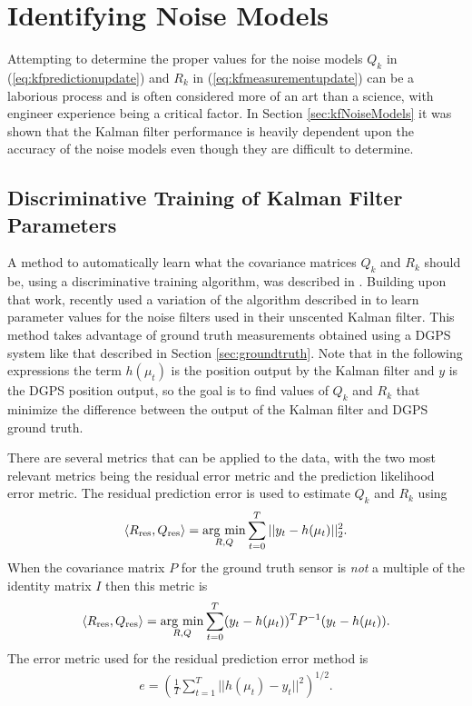 \section{Identifying Noise Models}
\label{sec:kfIdentifyNoiseModels}
Attempting to determine the proper values for the noise models $Q_k$ in (\ref{eq:kfpredictionupdate}) and $R_k$ in (\ref{eq:kfmeasurementupdate}) can be a laborious process and is often considered more of an art than a science, with engineer experience being a critical factor. In Section \ref{sec:kfNoiseModels} it was shown that the Kalman filter performance is heavily dependent upon the accuracy of the noise models even though they are difficult to determine.

\subsection{Discriminative Training of Kalman Filter Parameters}
\label{sec:kftrainingparams}
A method to automatically learn what the covariance matrices $Q_k$ and $R_k$ should be, using a discriminative training algorithm, was described in \cite{Abbeel-RSS-05}. Building upon that work, \cite{SakaiKuroda10} recently used a variation of the algorithm described in \cite{Abbeel-RSS-05} to learn parameter values for the noise filters used in their unscented Kalman filter. This method takes advantage of ground truth measurements obtained using a DGPS system like that described in Section \ref{sec:groundtruth}. Note that in the following expressions the term $h(\mu_t)$ is the position output by the Kalman filter and $y$ is the DGPS position output, so the goal is to find values of $Q_k$ and $R_k$ that minimize the difference between the output of the Kalman filter and DGPS ground truth.

There are several metrics that can be applied to the data, with the two most relevant metrics being the residual error metric and the prediction likelihood error metric. The residual prediction error is used to estimate $Q_k$ and $R_k$ using
\begin{align*}
\left<R_{\text{res}},Q_{\text{res}}\right> = \mathop{\arg\,\min}\limits_{R,Q}\sum_{t=0}^T ||y_t-h(\mu_t)||_2^2.
\end{align*}
When the covariance matrix $P$ for the ground truth sensor is \textit{not} a multiple of the identity matrix $I$ then this metric is
\begin{align*}
\left<R_{\text{res}},Q_{\text{res}}\right> = \mathop{\arg\,\min}\limits_{R,Q}\sum_{t=0}^T (y_t-h(\mu_t))^TP^{-1}(y_t-h(\mu_t)).
\end{align*}
The error metric used for the residual prediction error method is
\begin{align}
\label{eq:kftrainingres}
e = \left(\frac{1}{T}\sum_{t=1}^T ||h(\mu_t)-y_t||^2\right)^{1/2}.
\end{align}

